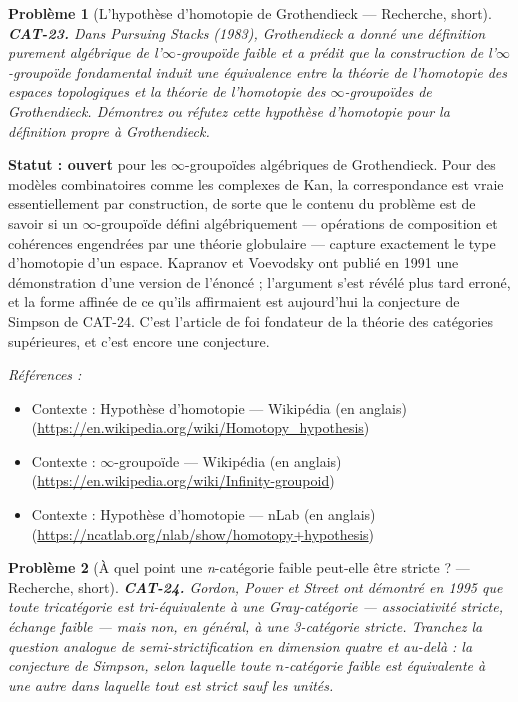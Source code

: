 \documentclass[11pt]{article}
\newtheorem{problem}{Problème}
\newenvironment{refs}{\par\small\noindent\emph{Références :}\begin{itemize}\setlength\itemsep{0pt}}{\end{itemize}\normalsize}
\begin{document}
\bigskip

\begin{problem}[{L'hypothèse d'homotopie de Grothendieck --- Recherche, short}]
\textbf{CAT-23.} Dans \textit{Pursuing Stacks} (1983), Grothendieck a donné une
définition purement algébrique de l'$\infty$-groupoïde faible et a prédit que la construction de
l'$\infty$-groupoïde fondamental induit une équivalence entre la théorie de l'homotopie des espaces
topologiques et la théorie de l'homotopie des $\infty$-groupoïdes de Grothendieck. Démontrez ou réfutez
cette hypothèse d'homotopie pour la définition propre à Grothendieck.
\end{problem}

\noindent \textbf{Statut : ouvert} pour les $\infty$-groupoïdes algébriques de Grothendieck. Pour
des modèles combinatoires comme les complexes de Kan, la correspondance est vraie essentiellement
par construction, de sorte que le contenu du problème est de savoir si un $\infty$-groupoïde défini
algébriquement --- opérations de composition et cohérences engendrées par une théorie globulaire ---
capture exactement le type d'homotopie d'un espace. Kapranov et Voevodsky ont publié en 1991 une
démonstration d'une version de l'énoncé ; l'argument s'est révélé plus tard erroné, et la forme
affinée de ce qu'ils affirmaient est aujourd'hui la conjecture de Simpson de CAT-24. C'est
l'article de foi fondateur de la théorie des catégories supérieures, et c'est encore une
conjecture.

\begin{refs}
\item Contexte : Hypothèse d'homotopie --- Wikipédia (en anglais) (\url{https://en.wikipedia.org/wiki/Homotopy_hypothesis})
\item Contexte : $\infty$-groupoïde --- Wikipédia (en anglais) (\url{https://en.wikipedia.org/wiki/Infinity-groupoid})
\item Contexte : Hypothèse d'homotopie --- nLab (en anglais) (\url{https://ncatlab.org/nlab/show/homotopy+hypothesis})
\end{refs}

\bigskip

\begin{problem}[{À quel point une \textit{n}-catégorie faible peut-elle être stricte ? --- Recherche, short}]
\textbf{CAT-24.} Gordon, Power et Street ont démontré en 1995 que toute
tricatégorie est tri-équivalente à une Gray-catégorie --- associativité stricte, échange faible ---
mais non, en général, à une 3-catégorie stricte. Tranchez la question analogue de
semi-strictification en dimension quatre et au-delà : la conjecture de Simpson, selon laquelle
toute $ n $-catégorie faible est équivalente à une autre dans laquelle tout est
strict sauf les unités.
\end{problem}
\end{document}
